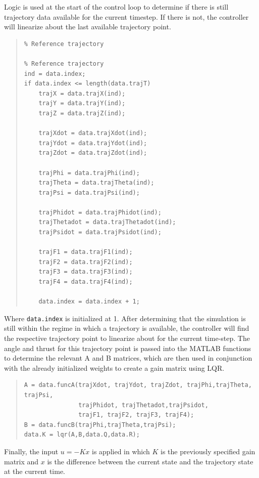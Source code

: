 \documentclass[12pt]{article}
\begin{document}
Logic is used at the start of the control loop to determine if there is still trajectory data available for the current timestep.  If there is not, the controller will linearize about the last available trajectory point.
\begin{quote}
\begin{lstlisting}
% Reference trajectory

% Reference trajectory
ind = data.index;
if data.index <= length(data.trajT)    
    trajX = data.trajX(ind);
    trajY = data.trajY(ind);
    trajZ = data.trajZ(ind);
    
    trajXdot = data.trajXdot(ind);
    trajYdot = data.trajYdot(ind);
    trajZdot = data.trajZdot(ind);
    
    trajPhi = data.trajPhi(ind);
    trajTheta = data.trajTheta(ind);
    trajPsi = data.trajPsi(ind);
    
    trajPhidot = data.trajPhidot(ind);
    trajThetadot = data.trajThetadot(ind);
    trajPsidot = data.trajPsidot(ind);
    
    trajF1 = data.trajF1(ind);
    trajF2 = data.trajF2(ind);
    trajF3 = data.trajF3(ind);
    trajF4 = data.trajF4(ind);
	
    data.index = data.index + 1;   
\end{lstlisting}
\end{quote}
Where \lstinline!data.index! is initialized at 1. 
\newline
\newline
After determining that the simulation is still within the regime in which a trajectory is available, the controller will find the respective trajectory point to linearize about for the current time-step.  The angle and thrust for this trajectory point is passed into the MATLAB functions to determine the relevant A and B matrices, which are then used in conjunction with the already initialized weights to create a gain matrix using LQR.
\begin{quote}
\begin{lstlisting}
A = data.funcA(trajXdot, trajYdot, trajZdot, trajPhi,trajTheta, trajPsi,
               trajPhidot, trajThetadot,trajPsidot, 
               trajF1, trajF2, trajF3, trajF4);
B = data.funcB(trajPhi,trajTheta,trajPsi);
data.K = lqr(A,B,data.Q,data.R);

\end{lstlisting}
\end{quote}

Finally, the input $u = -Kx$ is applied in which $K$ is the previously specified gain matrix and $x$ is the difference between the current state and the trajectory state at the current time.
\end{document}
